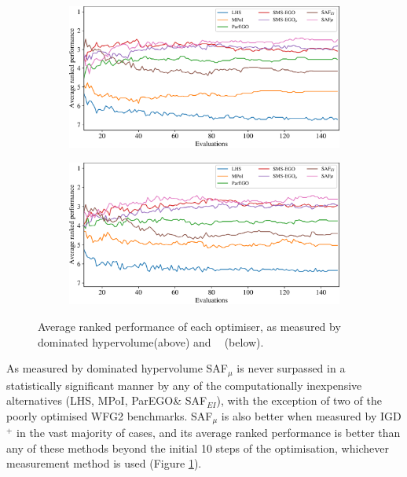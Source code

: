 \documentclass[conference]{IEEEtran}
\DeclareMathOperator*{\igdp}{IGD^{+}}
\newcommand\hpv{dominated hypervolume\xspace}
\newcommand\safmu{SAF$_{\mu}$\xspace}
\newcommand\safei{SAF$_{EI}$\xspace}
\newcommand\parego{ParEGO\xspace}
\newcommand\mpoi{MPoI\xspace}
\newcommand\lhs{LHS\xspace}
\newcommand\igd{IGD$^+$\xspace}
\begin{document}
\begin{figure}[t]
\begin{subfigure}[b]{\columnwidth}
         \centering
         \includegraphics[width=\columnwidth]{figures/_ranked_performance_plot_hv.pdf}
     \end{subfigure}
\begin{subfigure}[b]{\columnwidth}
         \centering
         \includegraphics[width=\columnwidth]{figures/_ranked_performance_plot_igd.pdf}
     \end{subfigure}
\caption{Average ranked performance of each optimiser, as measured by \hpv (above) and $\igdp$ (below).}
\label{fig: ranked_plots}
\end{figure}



As measured by \hpv \safmu is never surpassed in a statistically significant manner by any of the computationally inexpensive alternatives (\lhs, \mpoi, \parego \& \safei), with the exception of two of the poorly optimised WFG2 benchmarks. \safmu is also better when measured by \igd in the vast majority of cases, and its average ranked performance is  better than any of these methods beyond the initial 10 steps of the optimisation, whichever measurement method is used (Figure \ref{fig: ranked_plots}).  
\end{document}
